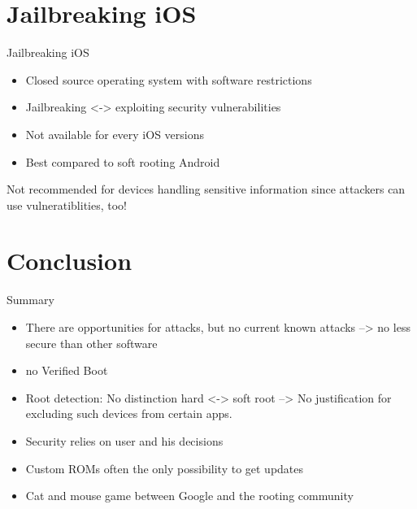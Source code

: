 \documentclass[
    11pt,%
    aspectratio=169,%
]{beamer}
\begin{document}
%
%
\section{Jailbreaking iOS}
\begin{frame}{Jailbreaking iOS}
\begin{itemize}
  \item Closed source operating system with software restrictions
  \item Jailbreaking <-> exploiting \alert{security vulnerabilities}
  \item Not available for every iOS versions
  \item Best compared to \alert{soft rooting} Android
\end{itemize}
Not recommended for devices handling \alert{sensitive information} since attackers can use vulneratiblities, too!
\end{frame}







%
%
\section{Conclusion}

\begin{frame}{Summary}
\begin{itemize}
  \item There are opportunities for attacks, but no current known attacks\newline
  --> no less secure than other software\newline
  \item no Verified Boot\newline
  \item Root detection: No distinction hard <-> soft root\newline
  --> No justification for excluding such devices from certain apps.\newline
  \item Security relies on user and his decisions\newline
  \item Custom ROMs often the only possibility to get updates\newline
  \item Cat and mouse game between Google and the rooting community\newline

\end{itemize}
\end{frame}
\end{document}
